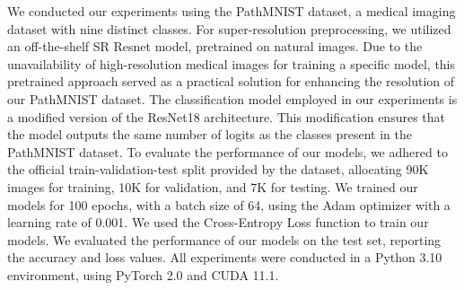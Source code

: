 \documentclass[10pt,twocolumn,letterpaper]{article}
\begin{document}
We conducted our experiments using the PathMNIST dataset, a medical imaging dataset with nine distinct classes. 
For super-resolution preprocessing, we utilized an off-the-shelf SR Resnet model, pretrained on natural images. Due to the unavailability of high-resolution medical images for training a specific model, this pretrained approach served as a practical solution for enhancing the resolution of our PathMNIST dataset.
The classification model employed in our experiments is a modified version of the ResNet18 architecture. This modification ensures that the model outputs the same number of logits as the classes present in the PathMNIST dataset.
To evaluate the performance of our models, we adhered to the official train-validation-test split provided by the dataset, allocating 90K images for training, 10K for validation, and 7K for testing.
We trained our models for 100 epochs, with a batch size of 64, using the Adam optimizer with a learning rate of 0.001. We used the Cross-Entropy Loss function to train our models.
We evaluated the performance of our models on the test set, reporting the accuracy and loss values. 
All experiments were conducted in a Python 3.10 environment, using PyTorch 2.0 and CUDA 11.1.
\end{document}
